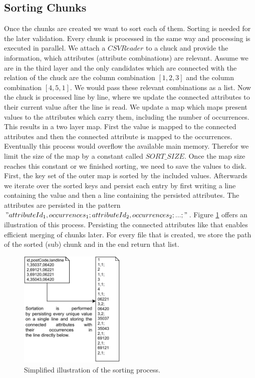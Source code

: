 \subsection{Sorting Chunks}
Once the chunks are created we want to sort each of them. Sorting is needed for the later validation. Every chunk is processed in the same way and processing is executed in parallel. We attach a $CSVReader$ to a chuck and provide the information, which attributes (attribute combinations) are relevant. Assume we are in the third layer and the only candidates which are connected with the relation of the chuck are the column combination $[1, 2, 3]$ and the column combination $[4, 5, 1]$. We would pass these relevant combinations as a list. Now the chuck is processed line by line, where we update the connected attributes to their current value after the line is read. We update a map which maps present values to the attributes which carry them, including the number of occurrences. This results in a two layer map. First the value is mapped to the connected attributes and then the connected attribute is mapped to the occurrences. Eventually this process would overflow the available main memory. Therefor we limit the size of the map by a constant called $SORT\_SIZE$. Once the map size reaches this constant or we finished sorting, we need to save the values to disk. First, the key set of the outer map is sorted by the included values. Afterwards we iterate over the sorted keys and persist each entry by first writing a line containing the value and then a line containing the persisted attributes. The attributes are persisted in the pattern $"attributeId_1,occurrences_1;attributeId_2,occurrences_2;...;"$. Figure \ref{fig:sorting} offers an illustration of this process. Persisting the connected attributes like that enables efficient merging of chunks later. For every file that is created, we store the path of the sorted (sub) chunk and in the end return that list.

\begin{figure}[h]
    \centering
    \includegraphics[width=0.45\textwidth]{files/Sorting.pdf}
    \caption{Simplified illustration of the sorting process.}
    \label{fig:sorting}
\end{figure}

